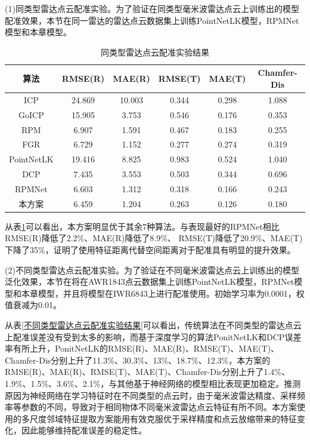 \par
(1)同类型雷达点云配准实验。为了验证在同类型毫米波雷达点云上训练出的模型配准效果，本节在同一雷达的雷达点云数据集上训练PointNetLK模型，RPMNet模型和本章模型。
\begin{table}[htbp]
	\centering
	\tabcolsep=3mm
	\caption{同类型雷达点云配准实验结果}
	\begin{tabular}{cccccc}
		\toprule
		算法 &  RMSE(R)&MAE(R)& RMSE(T)&MAE(T) & Chamfer-Dis \\
		\midrule
		ICP&24.869&10.003&0.344&0.298&1.088\\
		GoICP&15.905&3.753&0.546&0.176&0.353\\
		RPM&6.907&1.591&0.467&0.183&0.255\\
		FGR&6.729&1.152&0.277&0.274&0.319\\
		PointNetLK&19.416&8.825&0.983&0.524&1.040\\
		DCP&7.435&3.553&0.503&0.344&0.696\\
		RPMNet&6.603&1.312&0.318&0.166&0.243\\
		本方案&6.459&1.204&0.263&0.126&0.180\\
		\bottomrule
	\end{tabular}
	\label{同类型雷达点云配准实验结果}
\end{table}

从表\ref{同类型雷达点云配准实验结果}可以看出，本方案明显优于其余7种算法。与表现最好的RPMNet相比 RMSE(R)降低了2.2\%、MAE(R)降低了8.9\%、 RMSE(T)降低了20.9\%、MAE(T)下降了35\%，证明了使用特征距离代替空间距离对于配准具有明显的提升效果。

(2)不同类型雷达点云配准实验。为了验证在不同毫米波雷达点云上训练出的模型泛化效果，本节在将在AWR1843点云数据集上训练PointNetLK模型，RPMNet模型和本章模型，并且将模型在IWR6843上进行配准使用。初始学习率为0.0001，权值衰减为0.01。


从表\ref{不同类型雷达点云配准实验结果}可以看出，传统算法在不同类型的雷达点云上配准误差没有受到太多的影响，而基于深度学习的算法PonitNetLK和DCP误差率有所上升，PonitNetLK的RMSE(R)、MAE(R)、RMSE(T)、MAE(T)、Chamfer-Dis分别上升了11.3\%、30.3\%、13\%、18.7\%、12.3\%，本方案的RMSE(R)、MAE(R)、RMSE(T)、MAE(T)、Chamfer-Dis分别上升了1.4\%、1.9\%、1.5\%、3.6\%、2.1\%，与其他基于神经网络的模型相比表现更加稳定。推测原因为神经网络在学习特征时在不同类型的点云时，由于毫米波雷达精度、采样频率等参数的不同，导致对于相同物体不同毫米波雷达点云特征有所不同。本方案使用的多尺度邻域特征提取方案能用有效克服优于采样精度和点云放缩带来的特征变化，因此能够维持配准误差的稳定性。

